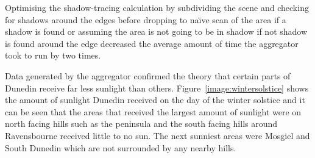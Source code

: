 \documentclass[12pt]{report}
\begin{document}
 Optimising the shadow-tracing calculation by subdividing the scene and checking for shadows around the edges before dropping to na\"{\i}ve scan of the area if a shadow is found or assuming the area is not going to be in shadow if not shadow is found around the edge decreased the average amount of time the aggregator took to run by two times.

Data generated by the aggregator confirmed the theory that certain parts of Dunedin receive far less sunlight than others. Figure~\ref{image:wintersolstice} shows the amount of sunlight Dunedin received on the day of the winter solstice and it can be seen that the areas that received the largest amount of sunlight were on north facing hills such as the peninsula and the south facing hills around Ravensbourne received little to no sun. The next sunniest areas were Mosgiel and South Dunedin which are not surrounded by any nearby hills. 



\end{document}
